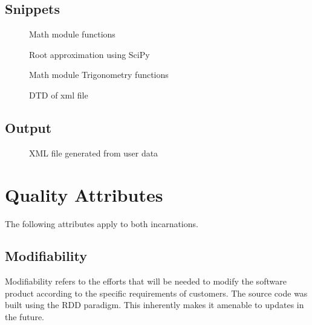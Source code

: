   \subsection{Snippets}
  \vspace{2em}
    \begin{figure}[h!]
      \centering
      \caption{Math module functions}
      \label{fig:Library functions for math}
    \end{figure}

    \begin{figure}[h!]
      \centering
      \caption{Root approximation using SciPy}
      \label{fig:SciPy Root Approximation}
    \end{figure}

    \begin{figure}[h!]
      \centering
      \caption{Math module Trigonometry functions}
      \label{fig:Math trigonometry functions}
    \end{figure}
    \begin{figure}[h!]
      \centering
      \caption{DTD of xml file}
      \label{fig:dtd of the output xml file}
    \end{figure}
    \subsection{Output}
    \begin{figure}[h!]
      \centering
      \caption{XML file generated from user data}
      \label{fig:output xml file}
    \end{figure}
    \pagebreak

   

\section{Quality Attributes}
  \begin{flushleft}
    The following attributes apply to both incarnations.
  \end{flushleft}
  \subsection{Modifiability}
    \begin{flushleft}
      Modifiability refers to the efforts that will be needed to modify the software product according to the specific requirements of customers\cite{8343604}. The source code was built using the RDD paradigm. This inherently makes it amenable to updates in the future.
    \end{flushleft}

